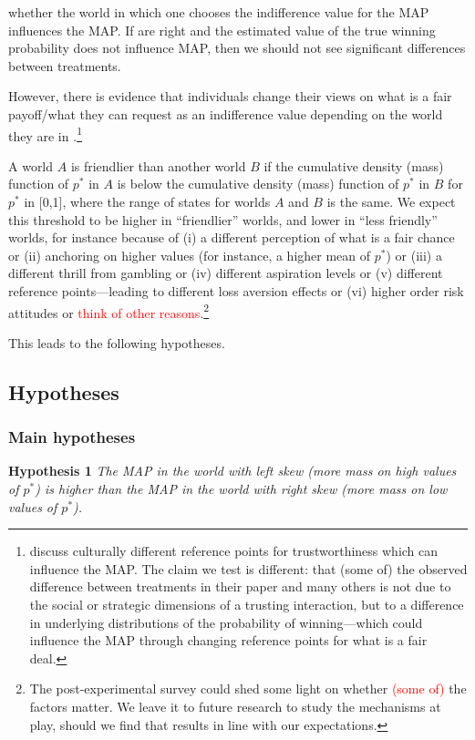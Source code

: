whether the world in which one chooses the indifference value for the MAP influences the MAP.
If \cite{Bohnet2008} are right and the estimated value of the true winning probability does not influence MAP, then we should not see significant differences between treatments.

However, there is evidence that individuals change their views on what is a fair payoff/what they can request as an indifference value depending on the world they are in \citep{Bohnet2008,Bohnet2010}.\footnote{
\cite{Bohnet2010} discuss culturally different reference points for trustworthiness which can influence the MAP.
The claim we test is different: that (some of) the observed difference between treatments in their paper and many others is not due to the social or strategic dimensions of a trusting interaction, but to a difference in underlying distributions of the probability of winning---which could influence the MAP through changing reference points for what is a fair deal.
}

A world $A$ is friendlier than another world $B$ if the cumulative density (mass) function of $p^*$ in $A$ is below the cumulative density (mass) function of $p^*$ in $B$ for $p^*$ in [0,1], where the range of states for worlds $A$ and $B$ is the same.
We expect this threshold to be higher in ``friendlier'' worlds, and lower in ``less friendly'' worlds, for instance because of (i) a different perception of what is a fair chance or (ii) anchoring on higher values (for instance, a higher mean of $p^*$) or (iii) a different thrill from gambling or (iv) different aspiration levels or (v) different reference points---leading to different loss aversion effects or (vi) higher order risk attitudes or \textcolor{red}{think of other reasons}.\footnote{
The post-experimental survey could shed some light on whether \textcolor{red}{(some of)} the factors matter.
We leave it to future research to study the mechanisms at play, should we find that results in line with our expectations.
}

This leads to the following hypotheses.

\subsection{Hypotheses}
\subsubsection{Main hypotheses}
\noindent \textbf{Hypothesis 1} \quad \textit{The MAP in the world with left skew (more mass on high values of $p^*$) is higher than the MAP in the world with right skew (more mass on low values of $p^*$).}

